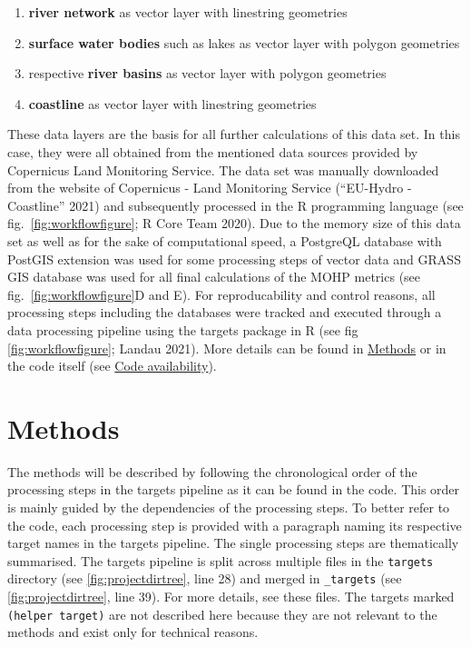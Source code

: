\documentclass[fleqn,10pt]{wlscirep}
\providecommand{\tightlist}{%
  \setlength{\itemsep}{0pt}\setlength{\parskip}{0pt}}
\begin{document}
\begin{enumerate}
\def\labelenumi{\arabic{enumi}.}
\tightlist
\item
  \textbf{river network} as vector layer with linestring geometries
\item
  \textbf{surface water bodies} such as lakes as vector layer with polygon geometries
\item
  respective \textbf{river basins} as vector layer with polygon geometries
\item
  \textbf{coastline} as vector layer with linestring geometries
\end{enumerate}

These data layers are the basis for all further calculations of this data set. In this case, they were all obtained from the mentioned data sources provided by Copernicus Land Monitoring Service. The data set was manually downloaded from the website of Copernicus - Land Monitoring Service ({``{EU}-{Hydro} - {Coastline}''} 2021) and subsequently processed in the R programming language (see fig.~\ref{fig:workflowfigure}; R Core Team 2020). Due to the memory size of this data set as well as for the sake of computational speed, a PostgreQL database with PostGIS extension was used for some processing steps of vector data and GRASS GIS database was used for all final calculations of the MOHP metrics (see fig.~\ref{fig:workflowfigure}D and E). For reproducability and control reasons, all processing steps including the databases were tracked and executed through a data processing pipeline using the targets package in R (see fig \ref{fig:workflowfigure}; Landau 2021). More details can be found in \protect\hyperlink{methods}{Methods} or in the code itself (see \protect\hyperlink{code-availability}{Code availability}).

\hypertarget{methods}{%
\section*{Methods}\label{methods}}

The methods will be described by following the chronological order of the processing steps in the targets pipeline as it can be found in the code. This order is mainly guided by the dependencies of the processing steps. To better refer to the code, each processing step is provided with a paragraph naming its respective target names in the targets pipeline. The single processing steps are thematically summarised. The targets pipeline is split across multiple files in the \texttt{targets} directory (see \ref{fig:projectdirtree}, line 28) and merged in \texttt{\_targets} (see \ref{fig:projectdirtree}, line 39). For more details, see these files. The targets marked \texttt{(helper\ target)} are not described here because they are not relevant to the methods and exist only for technical reasons.
\end{document}
